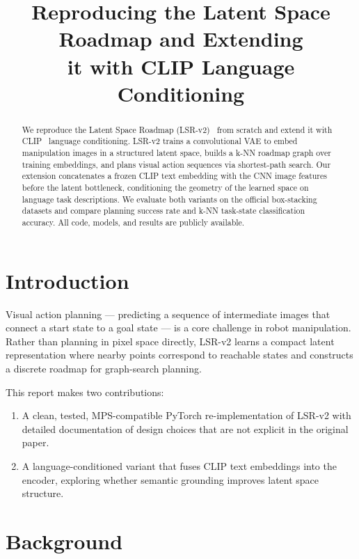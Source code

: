 \documentclass[10pt,twocolumn]{IEEEtran}
\title{%
  Reproducing the Latent Space Roadmap and Extending\\
  it with CLIP Language Conditioning
}
\author{%
  \IEEEauthorblockN{Anshuman Singh}
  \IEEEauthorblockA{%
    \textit{Independent}\\
    \href{https://singhanshuman.me}{singhanshuman.me}
  }
}
\begin{document}
\maketitle

\begin{abstract}
We reproduce the Latent Space Roadmap (LSR-v2)~\cite{lippi2023lsr}
from scratch and extend it with CLIP~\cite{radford2021clip} language
conditioning.  LSR-v2 trains a convolutional VAE to embed manipulation
images in a structured latent space, builds a k-NN roadmap graph over
training embeddings, and plans visual action sequences via shortest-path
search.  Our extension concatenates a frozen CLIP text embedding with the
CNN image features before the latent bottleneck, conditioning the geometry
of the learned space on language task descriptions.  We evaluate both
variants on the official box-stacking datasets and compare planning success
rate and k-NN task-state classification accuracy.  All code, models, and
results are publicly available.
\end{abstract}

\section{Introduction}

Visual action planning — predicting a sequence of intermediate images
that connect a start state to a goal state — is a core challenge in
robot manipulation.  Rather than planning in pixel space directly, LSR-v2
learns a compact latent representation where nearby points correspond to
reachable states and constructs a discrete roadmap for graph-search
planning.

This report makes two contributions:
\begin{enumerate}
  \item A clean, tested, MPS-compatible PyTorch re-implementation of LSR-v2
        with detailed documentation of design choices that are not explicit
        in the original paper.
  \item A language-conditioned variant that fuses CLIP text embeddings into
        the encoder, exploring whether semantic grounding improves latent
        space structure.
\end{enumerate}

\section{Background}
\end{document}
